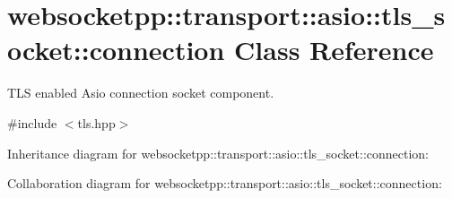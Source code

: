 \hypertarget{classwebsocketpp_1_1transport_1_1asio_1_1tls__socket_1_1connection}{}\section{websocketpp\+:\+:transport\+:\+:asio\+:\+:tls\+\_\+socket\+:\+:connection Class Reference}
\label{classwebsocketpp_1_1transport_1_1asio_1_1tls__socket_1_1connection}


T\+LS enabled Asio connection socket component.  




{\ttfamily \#include $<$tls.\+hpp$>$}



Inheritance diagram for websocketpp\+:\+:transport\+:\+:asio\+:\+:tls\+\_\+socket\+:\+:connection\+:


Collaboration diagram for websocketpp\+:\+:transport\+:\+:asio\+:\+:tls\+\_\+socket\+:\+:connection\+:
